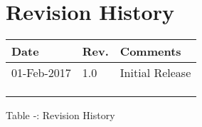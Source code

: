 \section{Revision History}\label{revision-history}

\begin{longtable}[]{@{}lll@{}}
\toprule
Date & Rev. & Comments\tabularnewline
\midrule
\endhead
01-Feb-2017 & 1.0 & Initial Release\tabularnewline
& &\tabularnewline
& &\tabularnewline
& &\tabularnewline
\bottomrule
\end{longtable}

Table ‑: Revision History